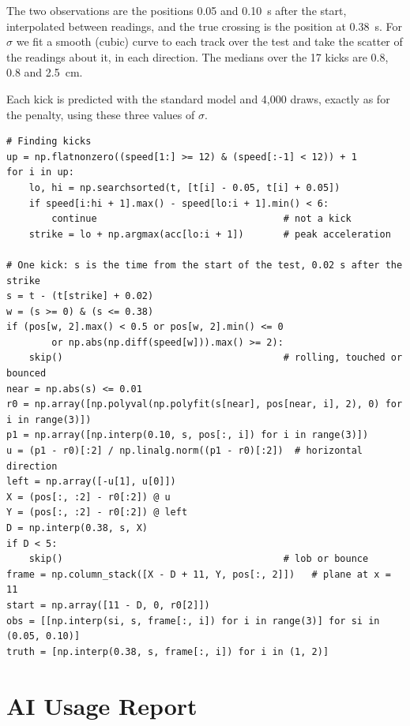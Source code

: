 \documentclass[10pt,a4paper]{article}
\begin{document}
The two observations are the positions \SI{0.05}{} and \SI{0.10}{\second} after the start, interpolated between readings, and the true crossing is the position at \SI{0.38}{\second}. For $\sigma$ we fit a smooth (cubic) curve to each track over the test and take the scatter of the readings about it, in each direction. The medians over the 17 kicks are \SI{0.8}{}, \SI{0.8}{} and \SI{2.5}{\centi\metre}.

Each kick is predicted with the standard model and 4{,}000 draws, exactly as for the penalty, using these three values of $\sigma$.

\begin{lstlisting}[caption={Code for the real-kick test. The arrays t, pos, speed and acc hold one ball's readings in seconds, meters, meters per second and meters per second squared.}, label=lst:realdata, captionpos=b]
# Finding kicks
up = np.flatnonzero((speed[1:] >= 12) & (speed[:-1] < 12)) + 1
for i in up:
    lo, hi = np.searchsorted(t, [t[i] - 0.05, t[i] + 0.05])
    if speed[i:hi + 1].max() - speed[lo:i + 1].min() < 6:
        continue                                 # not a kick
    strike = lo + np.argmax(acc[lo:i + 1])       # peak acceleration

# One kick: s is the time from the start of the test, 0.02 s after the strike
s = t - (t[strike] + 0.02)
w = (s >= 0) & (s <= 0.38)
if (pos[w, 2].max() < 0.5 or pos[w, 2].min() <= 0
        or np.abs(np.diff(speed[w])).max() >= 2):
    skip()                                       # rolling, touched or bounced
near = np.abs(s) <= 0.01
r0 = np.array([np.polyval(np.polyfit(s[near], pos[near, i], 2), 0) for i in range(3)])
p1 = np.array([np.interp(0.10, s, pos[:, i]) for i in range(3)])
u = (p1 - r0)[:2] / np.linalg.norm((p1 - r0)[:2])  # horizontal direction
left = np.array([-u[1], u[0]])
X = (pos[:, :2] - r0[:2]) @ u
Y = (pos[:, :2] - r0[:2]) @ left
D = np.interp(0.38, s, X)
if D < 5:
    skip()                                       # lob or bounce
frame = np.column_stack([X - D + 11, Y, pos[:, 2]])   # plane at x = 11
start = np.array([11 - D, 0, r0[2]])
obs = [[np.interp(si, s, frame[:, i]) for i in range(3)] for si in (0.05, 0.10)]
truth = [np.interp(0.38, s, frame[:, i]) for i in (1, 2)]
\end{lstlisting}



\clearpage
\section*{AI Usage Report}
\label{sec:ai-report}
\end{document}
